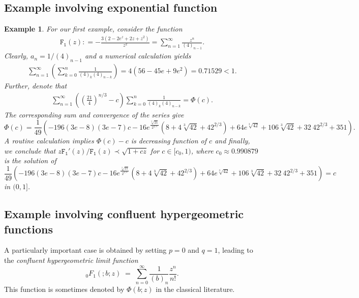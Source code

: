 \documentclass[a4paper,11pt,reqno]{amsart}
\newtheorem{example}{Example}[section]
\begin{document}
\subsection{Example involving exponential function}\label{sec:Appl-exponential}
\begin{example}
    For our first example, consider the function
    \begin{align*}
        \mathtt{F_1}(z): = -\frac{3 (2 - 2 e^z + 2 z + z^2)}{z^2}=\sum _{n=1}^{\infty } \frac{z^n}{(4)_{n-1}}. 
    \end{align*}
    Clearly, $a_n= 1/(4)_{n-1}$ and a numerical calculation yields 
    \begin{align}
        \sum _{n=1}^{\infty } \left(\sum _{k=0}^n \frac{1}{(4)_k (4)_{n-k}}\right)=4 \left(56-45 e+9 e^2\right) = 0.71529<1.    
        \end{align}
Further, denote that 
\begin{align*}
    \sum _{n=1}^{\infty } \left(\left(\frac{21}{4}\right)^{n/3}-c\right) \sum _{k=0}^n \frac{1}{(4)_k (4)_{n-k}}=\Phi(c).
\end{align*}
The corresponding sum and convergence of the series give 
\[\Phi(c)=\frac{1}{49} \left(-196 (3 e-8) (3 e-7) c-16 e^{\frac{\sqrt[3]{21}}{2^{2/3}}} \left(8+4 \sqrt[3]{42}+42^{2/3}\right)+64 e^{\sqrt[3]{42}}+106 \sqrt[3]{42}+32\ 42^{2/3}+351\right). \]
A routine calculation implies $\Phi(c)- c$ is decreasing function of $c$ and finally, we conclude that 
 $z\mathtt{F_1}'(z)/\mathtt{F_1}(z) \prec \sqrt{1+cz}$ for $c \in [c_0, 1) $, where $c_0 \approx 0.990879$ is the solution of 
\[\frac{1}{49} \left(-196 (3 e-8) (3 e-7) c-16 e^{\frac{\sqrt[3]{21}}{2^{2/3}}} \left(8+4 \sqrt[3]{42}+42^{2/3}\right)+64 e^{\sqrt[3]{42}}+106 \sqrt[3]{42}+32\ 42^{2/3}+351\right)=c\] in $(0, 1]$. 
\end{example}

\subsection{Example involving confluent hypergeometric functions}\label{sec:Appl-conf-hyp}

A particularly important case is obtained by setting $p=0$ and $q=1$, leading to the \textit{confluent hypergeometric limit function}
\begin{equation}
{}_0F_1(;b;z) \;=\; \sum_{n=0}^{\infty} \frac{1}{(b)_n} \frac{z^n}{n!}.
\end{equation}
This function is sometimes denoted by $\Phi(b;z)$ in the classical literature.
\end{document}
